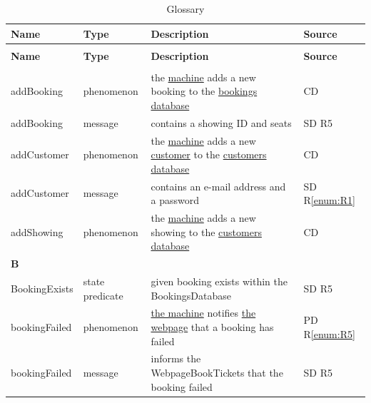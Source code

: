 \documentclass[a4paper,10pt,titlepage,bibtotoc,bibtotocnumbered]{scrreprt}
\begin{document}
\begin{longtable}{|l|p{3cm}|p{5cm}|l|}
\caption{Glossary}
\label{table:glossar}\\
\hline
\rowcolor{black!25}\textbf{Name} & \textbf{Type} & \textbf{Description} & \textbf{Source}\\
\hline
\endfirsthead
\caption[]{Glossary}\\
\hline
\rowcolor{black!25}\textbf{Name} & \textbf{Type} & \textbf{Description} & \textbf{Source}\\
\endhead
\hline
\endfoot
\multicolumn{4}{|l|}{\textbf{A}}\\
\hline
\hypertarget{glossary:addBooking}{addBooking} & phenomenon & the \hyperlink{glossary:UDEKino}{machine} adds a new booking to the \hyperlink{glossary:BookingsDatabase}{bookings database} & CD\\
\hline
addBooking & message & contains a showing ID and seats & SD R5\\
\hline
\hypertarget{glossary:addCustomer}{addCustomer} & phenomenon & the \hyperlink{glossary:UDEKino}{machine} adds a new \hyperlink{glossary:Customer}{customer} to the \hyperlink{glossary:CustomersDatabase}{customers database} & CD\\
\hline
addCustomer & message & contains an e-mail address and a password & SD R\ref{enum:R1}\\
\hline
\hypertarget{glossary:addShowing}{addShowing} & phenomenon & the \hyperlink{glossary:UDEKino}{machine} adds a new showing to the \hyperlink{glossary:ShowingsDatabase}{customers database} & CD\\
\hline
\multicolumn{4}{|l|}{\textbf{B}}\\
\hline
BookingExists & state predicate & given booking exists within the BookingsDatabase & SD R5\\
\hline
\hypertarget{glossary:bookingFailed}{bookingFailed} & phenomenon & \hyperlink{glossary:UDEKino}{the machine} notifies \hyperlink{glossary:WebpageBookTickets}{the webpage} that a booking has failed & PD R\ref{enum:R5}\\
\hline
bookingFailed & message & informs the WebpageBookTickets that the booking failed & SD R5\\

\end{longtable}
\end{document}
